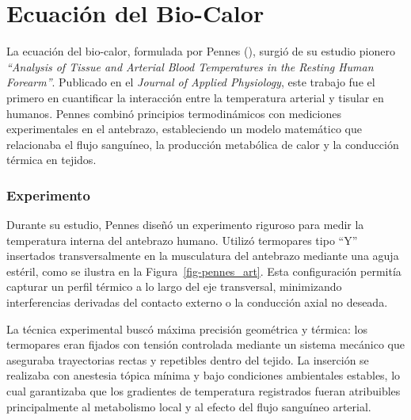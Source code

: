 \documentclass[
  spanish,
  us-letterpaper,
  DIV=11,
  numbers=noendperiod]{scrreprt}
\theoremstyle{plain}
\theoremstyle{definition}
\theoremstyle{remark}
\begin{document}
\part{Ecuación del Bio-Calor}

La ecuación del bio-calor, formulada por Pennes
(), surgió de su estudio pionero
\emph{``Analysis of Tissue and Arterial Blood Temperatures in the
Resting Human Forearm''}. Publicado en el \emph{Journal of Applied
Physiology}, este trabajo fue el primero en cuantificar la interacción
entre la temperatura arterial y tisular en humanos. Pennes combinó
principios termodinámicos con mediciones experimentales en el antebrazo,
estableciendo un modelo matemático que relacionaba el flujo sanguíneo,
la producción metabólica de calor y la conducción térmica en tejidos.

\section*{Experimento}\label{experimento}


Durante su estudio, Pennes diseñó un experimento riguroso para medir la
temperatura interna del antebrazo humano. Utilizó termopares tipo ``Y''
insertados transversalmente en la musculatura del antebrazo mediante una
aguja estéril, como se ilustra en la Figura~\ref{fig-pennes_art}. Esta
configuración permitía capturar un perfil térmico a lo largo del eje
transversal, minimizando interferencias derivadas del contacto externo o
la conducción axial no deseada.

La técnica experimental buscó máxima precisión geométrica y térmica: los
termopares eran fijados con tensión controlada mediante un sistema
mecánico que aseguraba trayectorias rectas y repetibles dentro del
tejido. La inserción se realizaba con anestesia tópica mínima y bajo
condiciones ambientales estables, lo cual garantizaba que los gradientes
de temperatura registrados fueran atribuibles principalmente al
metabolismo local y al efecto del flujo sanguíneo arterial.
\end{document}
